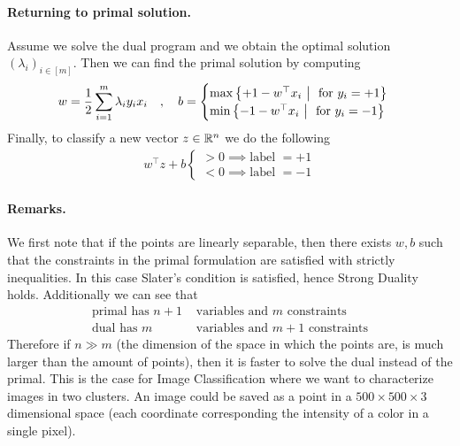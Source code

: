 \documentclass[answers]{exam}
\begin{document}
    \paragraph{Returning to primal solution.} Assume we solve the dual program and we obtain the optimal solution $(\lambda_i)_{i\in [m]}$. Then we can find the primal solution by computing 
    \begin{align*}
        w = \frac{1}{2}\sum_{i=1}^m \lambda_i y_i x_i\quad ,\quad b = \begin{cases}
            \max\left\{+1-w^\top x_i \ \middle|\ \text{ for } y_i = +1\right\} \\ 
            \min\left\{-1-w^\top x_i \ \middle|\ \text{ for } y_i = -1\right\} 
        \end{cases}
    \end{align*}
    Finally, to classify a new vector $z\in \mathbb{R}^n$ we do the following
    \begin{align*}
        w^\top z + b \begin{cases}
            > 0 \implies \text{label } = +1 \\ 
            < 0 \implies \text{label } = -1
        \end{cases}
    \end{align*}
    \paragraph{Remarks.} We first note that if the points are linearly separable, then there exists $w,b$ such that the constraints in the primal formulation are satisfied with strictly inequalities. In this case Slater's condition is satisfied, hence Strong Duality holds. Additionally we can see that 
    \begin{align*}
        \text{primal has } n+1 &\text{ variables and }  m \text{ constraints} \\ 
        \text{dual has } m &\text{ variables and } m+1 \text{ constraints} 
    \end{align*}
    Therefore if $n\gg m$ (the dimension of the space in which the points are, is much larger than the amount of points), then it is faster to solve the dual instead of the primal. This is the case for Image Classification where we want to characterize images in two clusters. An image could be saved as a point in a $500\times 500 \times 3$ dimensional space (each coordinate corresponding the intensity of a color in a single pixel).
\end{document}
